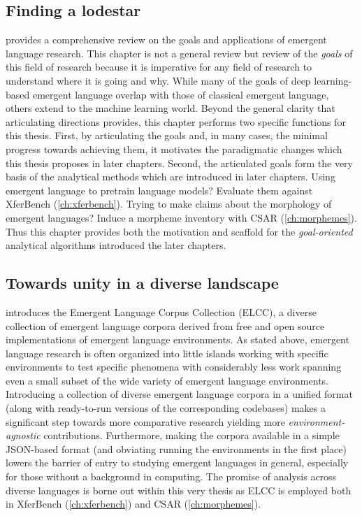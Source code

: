 

\subsection{Finding a lodestar}%
\label{sec:intro-review}
 provides a comprehensive review on the goals and applications of emergent language research.
This chapter is not a general review but review of the \emph{goals} of this field of research because it is imperative for any field of research to understand where it is going and why.
While many of the goals of deep learning-based emergent language overlap with those of classical emergent language, others extend to the machine learning world.
Beyond the general clarity that articulating directions provides, this chapter performs two specific functions for this thesis.
First, by articulating the goals and, in many cases, the minimal progress towards achieving them, it motivates the paradigmatic changes which this thesis proposes in later chapters.
Second, the articulated goals form the very basis of the analytical methods which are introduced in later chapters.
Using emergent language to pretrain language models?
  Evaluate them against XferBench (\cref{ch:xferbench}).
Trying to make claims about the morphology of emergent languages?
  Induce a morpheme inventory with CSAR (\cref{ch:morphemes}).
Thus this chapter provides both the motivation and scaffold for the \emph{goal-oriented} analytical algorithms introduced the later chapters.

\subsection{Towards unity in a diverse landscape}%
\label{sec:intro-elcc}

 introduces the Emergent Language Corpus Collection (ELCC), a diverse collection of emergent language corpora derived from free and open source implementations of emergent language environments.
As stated above, emergent language research is often organized into little islands working with specific environments to test specific phenomena with considerably less work spanning even a small subset of the wide variety of emergent language environments.
Introducing a collection of diverse emergent language corpora in a unified format (along with ready-to-run versions of the corresponding codebases) makes a significant step towards more comparative research yielding more \emph{environment-agnostic} contributions.
Furthermore, making the corpora available in a simple JSON-based format (and obviating running the environments in the first place) lowers the barrier of entry to studying emergent languages in general, especially for those without a background in computing.
The promise of analysis across diverse languages is borne out within this very thesis as ELCC is employed both in XferBench (\cref{ch:xferbench}) and CSAR (\cref{ch:morphemes}).


